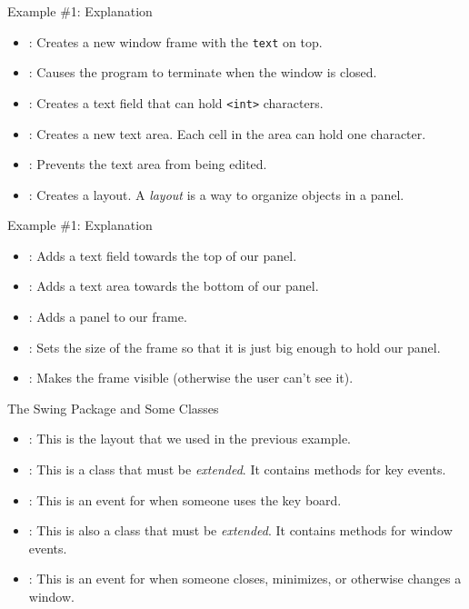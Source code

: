 \begin{frame}{Example \#1: Explanation}
\begin{itemize}
\item {}: Creates a new window frame with the \texttt{text} on top.\pause
\item {}: Causes the program to terminate when the window is closed.\pause
\item {}: Creates a text field that can hold \texttt{<int>} characters.\pause
\item {}: Creates a new text area. Each cell in the area can hold one character.\pause
\item {}: Prevents the text area from being edited.\pause
\item {}: Creates a layout. A \emph{layout} is a way to organize objects in a panel.
\end{itemize}
\end{frame}


\begin{frame}{Example \#1: Explanation}
\begin{itemize}
\item {}: Adds a text field towards the top of our panel.\pause
\item {}: Adds a text area towards the bottom of our panel.\pause
\item {}: Adds a panel to our frame.\pause
\item {}: Sets the size of the frame so that it is just big enough to hold our panel.\pause
\item {}: Makes the frame visible (otherwise the user can't see it).
\end{itemize}
\end{frame}

\begin{frame}{The Swing Package and Some Classes}
\begin{itemize}
\item {}: This is the layout that we used in the previous example.\pause
\item {}: This is a class that must be \emph{extended}. It contains methods for key events.\pause
\item {}: This is an event for when someone uses the key board.\pause
\item {}: This is also a class that must be \emph{extended}. It contains methods for window events.\pause
\item {}: This is an event for when someone closes, minimizes, or otherwise changes a window.\pause
\end{itemize}
\end{frame}

